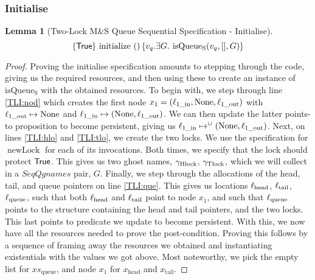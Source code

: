 \documentclass[a4paper, 10pt]{report}
\theoremstyle{definition}
\newtheorem{lemma}[theorem]{Lemma}
\newcommand{\newLock}{\operatorname{newLock}}
\newcommand{\initialise}{\operatorname{initialize}}
\newcommand{\msq}{M\&S Queue}
\newcommand{\tlmsq}{Two-Lock \msq{}}
\newcommand{\isqueueseq}{\operatorname{isQueue_{S}}}
\newcommand{\SeqQgnames}{SeqQgnames}
\newcommand{\vq}{v_q}
\newcommand{\xsqueue}{xs_{\mathrm{queue}}}
\newcommand{\locinM}[1]{\loc_{#1\_\mathrm{in}}}
\newcommand{\locoutM}[1]{\loc_{#1\_\mathrm{out}}}
\newcommand{\locN}[1]{\loc_{\mathrm{#1}}}
\newcommand{\lochead}{\locN{head}}
\newcommand{\loctail}{\locN{tail}}
\newcommand{\locqueue}{\locN{queue}}
\newcommand{\node}{x}
\newcommand{\nodeM}[1]{\node_{#1}}
\newcommand{\nodeN}[1]{\node_{\mathrm{#1}}}
\newcommand{\nodehead}{\nodeN{head}}
\newcommand{\nodetail}{\nodeN{tail}}
\newcommand{\Qg}{G}
\newcommand{\ghlock}{\gname_{\mathrm{Hlock}}}
\newcommand{\gtlock}{\gname_{\mathrm{Tlock}}}
\newcommand{\tlseqspecinitHTGen}[2]{\hoare{\TRUE}{\initialise \ \TT}{#1 . \Exists #2. \isqueueseq(#1, [], #2)}}
\newcommand{\tlseqspecinitGen}[2]{\tlseqspecinitHTGen{#1}{#2}}
\newcommand{\tlseqspecinit}{\tlseqspecinitGen{\vq}{\Qg}}
\begin{document}
\subsubsection{Initialise}
\begin{lemma}[\tlmsq{} Sequential Specification - Initialise]\label{TLMSQ:spec:seq:init}
  \begin{equation*}
    \tlseqspecinit
  \end{equation*}
\end{lemma}
\begin{proof}
Proving the initialise specification amounts to stepping through the code, giving us the required resources, and then using these to create an instance of $\isqueueseq$ with the obtained resources. To begin with, we step through line \ref{TLI:nod} which creates the first node $\nodeM{1} = (\locinM{1}, \None, \locoutM{1})$ with $\locoutM{1} \mapsto \None$ and $\locinM{1} \mapsto (\None, \locoutM{1})$. We can then update the latter points-to proposition to become persistent, giving us $\locinM{1} \mapsto^{\persistently} (\None, \locoutM{1})$. Next, on lines \ref{TLI:hlo} and \ref{TLI:tlo}, we create the two locks. We use the specification for $\newLock$ for each of its invocations. Both times, we specify that the lock should protect $\textsf{True}$. This gives us two ghost names, $\ghlock$, $\gtlock$, which we will collect in a $\SeqQgnames$ pair, $\Qg$.
Finally, we step through the allocations of the head, tail, and queue pointers on line \ref{TLI:que}. This gives us locations $\lochead$, $\loctail$, $\locqueue$, such that both $\lochead$ and $\loctail$ point to node $\nodeM{1}$, and such that $\locqueue$ points to the structure containing the head and tail pointers, and the two locks. This last points to predicate we update to become persistent.
With this, we now have all the resources needed to prove the post-condition. Proving this follows by a sequence of framing away the resources we obtained and instantiating existentials with the values we got above. Most noteworthy, we pick the empty list for $\xsqueue$, and node $\nodeM{1}$ for $\nodehead$ and $\nodetail$.
\end{proof}
\end{document}
